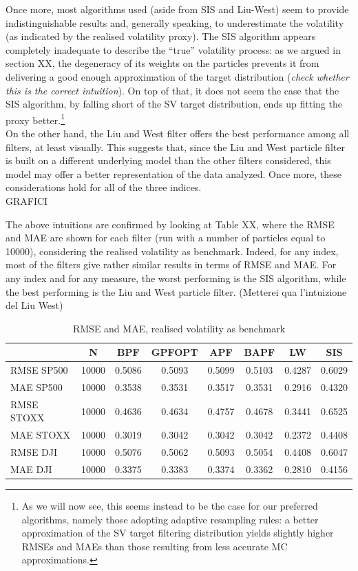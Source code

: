 \documentclass[
]{book}
\theoremstyle{break}
\theoremstyle{nonumberplain}
\begin{document}
Once more, most algorithms used (aside from SIS and Liu-West) seem to
provide indistinguishable results and, generally speaking, to
underestimate the volatility (as indicated by the realised volatility
proxy). The SIS algorithm appears completely inadequate to describe the
``true'' volatility process: as we argued in section XX, the degeneracy
of its weights on the particles prevents it from delivering a good
enough approximation of the target distribution
(\textit{check whether this is the correct intuition}). On top of that,
it does not seem the case that the SIS algorithm, by falling short of
the SV target distribution, ends up fitting the proxy
better.\footnote{As we will now see, this seems instead to be the case for our preferred algorithms, namely those adopting adaptive resampling rules: a better approximation of the SV target filtering distribution yields slightly higher RMSEs and MAEs than those resulting from less accurate MC approximations.}\\
On the other hand, the Liu and West filter offers the best performance
among all filters, at least visually. This suggests that, since the Liu
and West particle filter is built on a different underlying model than
the other filters considered, this model may offer a better
representation of the data analyzed. Once more, these considerations
hold for all of the three indices.\\

GRAFICI

The above intuitions are confirmed by looking at Table XX, where the
RMSE and MAE are shown for each filter (run with a number of particles
equal to 10000), considering the realised volatility as benchmark.
Indeed, for any index, most of the filters give rather similar results
in terms of RMSE and MAE. For any index and for any measure, the worst
performing is the SIS algorithm, while the best performing is the Liu
and West particle filter. (Metterei qua l'intuizione del Liu West)\\

\begin{longtable}[t]{lccccccc}
\caption{\label{tab:unnamed-chunk-42}RMSE and MAE, realised volatility as benchmark}\\
\toprule
  & N & BPF & GPFOPT & APF & BAPF & LW & SIS\\
\midrule
RMSE SP500 & 10000 & 0.5086 & 0.5093 & 0.5099 & 0.5103 & 0.4287 & 0.6029\\
MAE SP500 & 10000 & 0.3538 & 0.3531 & 0.3517 & 0.3531 & 0.2916 & 0.4320\\
RMSE STOXX & 10000 & 0.4636 & 0.4634 & 0.4757 & 0.4678 & 0.3441 & 0.6525\\
MAE STOXX & 10000 & 0.3019 & 0.3042 & 0.3042 & 0.3042 & 0.2372 & 0.4408\\
RMSE DJI & 10000 & 0.5076 & 0.5062 & 0.5093 & 0.5054 & 0.4408 & 0.6047\\
\addlinespace
MAE DJI & 10000 & 0.3375 & 0.3383 & 0.3374 & 0.3362 & 0.2810 & 0.4156\\
\bottomrule
\end{longtable}
\end{document}
